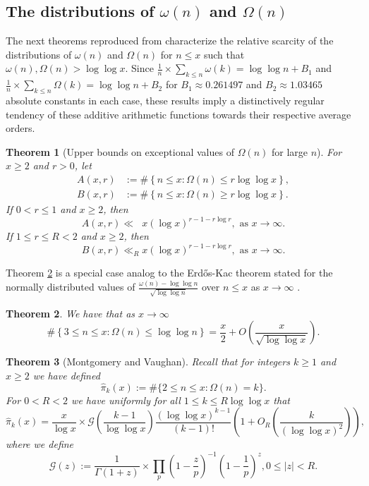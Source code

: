 \documentclass[11pt,reqno,a4letter]{article}
\numberwithin{figure}{section}
\numberwithin{table}{section}
\newcommand{\cf}{\textit{cf.\ }}
\theoremstyle{plain}
\newtheorem{theorem}{Theorem}
\numberwithin{theorem}{section}
\theoremstyle{definition}
\begin{document}
\subsection{The distributions of $\omega(n)$ and $\Omega(n)$} 
\label{subSection_TheKnownDistsOfThePrimeOmegaFunctions_IntroResults_v1} 

The next theorems reproduced from \cite[\S 7.4]{MV} characterize the relative 
scarcity of the distributions of $\omega(n)$ and $\Omega(n)$ for $n \leq x$ such that 
$\omega(n),\Omega(n) > \log\log x$. 
Since $\frac{1}{n} \times \sum_{k \leq n} \omega(k) = \log\log n + B_1$ and 
$\frac{1}{n} \times \sum_{k \leq n} \Omega(k) = \log\log n + B_2$ for 
$B_1 \approx 0.261497$ and $B_2 \approx 1.03465$ 
absolute constants in each case, 
these results imply a distinctively regular tendency 
of these additive arithmetic functions towards their respective average orders. 

\begin{theorem}[Upper bounds on exceptional values of $\Omega(n)$ for large $n$] 
\label{theorem_MV_Thm7.20-init_stmt} 
For $x \geq 2$ and $r > 0$, let 
\begin{align*} 
A(x, r) & := \#\left\{n \leq x: \Omega(n) \leq r \log\log x\right\}, \\ 
B(x, r) & := \#\left\{n \leq x: \Omega(n) \geq r \log\log x\right\}. 
\end{align*} 
If $0 < r \leq 1$ and $x \geq 2$, then 
\[
A(x, r) \ll\phantom{_R} x (\log x)^{r-1 - r\log r}, \text{ as } x \rightarrow \infty. 
\]
If $1 \leq r \leq R < 2$ and $x \geq 2$, then 
\[
B(x, r) \ll_R x (\log x)^{r-1-r \log r}, \text{ as } x \rightarrow \infty. 
\]
\end{theorem} 

Theorem \ref{theorem_MV_Thm7.21-init_stmt} is a special case analog to the 
Erd\H{o}s-Kac theorem stated for the 
normally distributed values of 
$\frac{\omega(n) - \log\log n}{\sqrt{\log\log n}}$ over $n \leq x$ as 
$x \rightarrow \infty$ \cite[\cf Thm.\ 7.21]{MV} \cite[\cf \S 1.7]{IWANIEC-KOWALSKI}. 

\begin{theorem}
\label{theorem_MV_Thm7.21-init_stmt} 
We have that as $x \rightarrow \infty$ 
\[
\#\left\{3 \leq n \leq x: \Omega(n) \leq \log\log n \right\} = 
     \frac{x}{2} + O\left(\frac{x}{\sqrt{\log\log x}}\right). 
\]
\end{theorem} 

\begin{theorem}[Montgomery and Vaughan]
\label{theorem_HatPi_ExtInTermsOfGz} 
Recall that for integers $k \geq 1$ and $x \geq 2$ we have defined 
$$\widehat{\pi}_k(x) := \#\{2 \leq n \leq x: \Omega(n)=k\}.$$ 
For $0 < R < 2$ we have uniformly for all $1 \leq k \leq R \log\log x$ that 
\[
\widehat{\pi}_k(x) = \frac{x}{\log x} \times \mathcal{G}\left(\frac{k-1}{\log\log x}\right) 
     \frac{(\log\log x)^{k-1}}{(k-1)!} \left(1 + O_R\left(\frac{k}{(\log\log x)^2}\right)\right), 
\]
where we define 
\[
\mathcal{G}(z) := \frac{1}{\Gamma(1+z)} \times 
     \prod_p \left(1-\frac{z}{p}\right)^{-1} \left(1-\frac{1}{p}\right)^z, 0 \leq |z| < R. 
\]
\end{theorem} 
\end{document}
